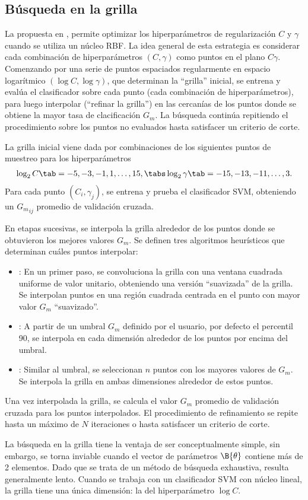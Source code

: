 %
%
\subsection{Búsqueda en la grilla}
%
La  propuesta en \cite{hsu}, permite
optimizar los hiperparámetros de regularización $C$ y $\gamma$ cuando
se utiliza un núcleo RBF.
La idea general de esta estrategia es considerar cada combinación de
hiperparámetros $(C,\gamma)$ como puntos en el plano $C\gamma$.
Comenzando por una serie de puntos espaciados regularmente
en espacio logarítmico $(\log C,\log\gamma)$, que determinan la
``grilla'' inicial, se entrena y evalúa el clasificador sobre cada
punto (cada combinación de hiperparámetros), para luego interpolar
(``refinar la grilla'') en las cercanías de los puntos donde se
obtiene la mayor tasa de clacificación $G_m$.
La búsqueda continúa repitiendo el procedimiento sobre los puntos no
evaluados hasta satisfacer un criterio de corte.

La grilla inicial viene dada por combinaciones de los siguientes
puntos de muestreo para los hiperparámetros
%
\begin{align}
  \label{initial-grid}
  \log_2 C     \tab= -5, -3, -1, 1, \ldots, 15, \tabs
  \log_2\gamma \tab= -15,-13, -11, \ldots, 3.
\end{align}
%
Para cada punto $(C_i,\gamma_j)$, se entrena y prueba el clasificador
SVM, obteniendo un ${G_m}_{ij}$ promedio de validación cruzada.

En etapas sucesivas, se interpola la grilla alrededor de los puntos
donde se obtuvieron los mejores valores $G_m$. Se definen tres
algoritmos heurísticos que determinan cuáles puntos interpolar:
%
\begin{itemize}
\item
  : En un primer paso, se convoluciona la grilla con una
  ventana cuadrada uniforme de valor unitario, obteniendo una versión
  ``suavizada'' de la grilla. Se interpolan puntos en una región
  cuadrada centrada en el punto con mayor valor $G_m$ ``suavizado''.
\item
  : A partir de un umbral $G_m$ definido por el usuario,
  por defecto el percentil 90, se interpola en cada dimensión
  alrededor de los puntos por encima del umbral.
\item
  : Similar al umbral, se seleccionan $n$ puntos
  con los mayores valores de $G_m$. Se interpola la grilla en ambas
  dimensiones alrededor de estos puntos.
\end{itemize}
%
Una vez interpolada la grilla, se calcula el valor $G_m$ promedio de
validación cruzada para los puntos interpolados. El procedimiento de
refinamiento se repite hasta un máximo de $N$ iteraciones o hasta
satisfacer un criterio de corte.

La búsqueda en la grilla tiene la ventaja de ser conceptualmente
simple, sin embargo, se torna inviable cuando el vector de parámetros
$\B{\theta}$ contiene más de 2 elementos.
Dado que se trata de un método de búsqueda exhaustiva, resulta
generalmente lento.
Cuando se trabaja con un clasificador SVM con núcleo lineal, la grilla
tiene una única dimensión: la del hiperparámetro $\log C$.
